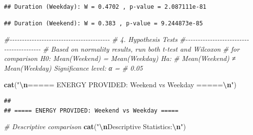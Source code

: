 \documentclass[
  12pt,
]{article}
\newenvironment{Shaded}{\begin{snugshade}}{\end{snugshade}}
\newcommand{\AttributeTok}[1]{\textcolor[rgb]{0.13,0.29,0.53}{#1}}
\newcommand{\CommentTok}[1]{\textcolor[rgb]{0.56,0.35,0.01}{\textit{#1}}}
\newcommand{\ConstantTok}[1]{\textcolor[rgb]{0.56,0.35,0.01}{#1}}
\newcommand{\DecValTok}[1]{\textcolor[rgb]{0.00,0.00,0.81}{#1}}
\newcommand{\FunctionTok}[1]{\textcolor[rgb]{0.13,0.29,0.53}{\textbf{#1}}}
\newcommand{\NormalTok}[1]{#1}
\newcommand{\SpecialCharTok}[1]{\textcolor[rgb]{0.81,0.36,0.00}{\textbf{#1}}}
\newcommand{\StringTok}[1]{\textcolor[rgb]{0.31,0.60,0.02}{#1}}
\begin{document}
\begin{verbatim}
## Duration (Weekday): W = 0.4702 , p-value = 2.087111e-81
\end{verbatim}

\begin{Shaded}
\end{Shaded}

\begin{verbatim}
## Duration (Weekend): W = 0.383 , p-value = 9.244873e-85
\end{verbatim}

\begin{Shaded}
\begin{Highlighting}[]
\CommentTok{\#{-}{-}{-}{-}{-}{-}{-}{-}{-}{-}{-}{-}{-}{-}{-}{-}{-}{-}{-}{-}{-}{-}{-}{-}{-}{-}{-}{-}{-}{-}{-}{-}{-}{-}{-}{-}{-}{-}{-}{-}{-}}
\CommentTok{\# 4. Hypothesis Tests}
\CommentTok{\#{-}{-}{-}{-}{-}{-}{-}{-}{-}{-}{-}{-}{-}{-}{-}{-}{-}{-}{-}{-}{-}{-}{-}{-}{-}{-}{-}{-}{-}{-}{-}{-}{-}{-}{-}{-}{-}{-}{-}{-}{-}}
\CommentTok{\# Based on normality results, run both t{-}test and Wilcoxon}
\CommentTok{\# for comparison H0: Mean(Weekend) = Mean(Weekday) Ha:}
\CommentTok{\# Mean(Weekend) ≠ Mean(Weekday) Significance level: α =}
\CommentTok{\# 0.05}

\FunctionTok{cat}\NormalTok{(}\StringTok{"}\SpecialCharTok{\textbackslash{}n}\StringTok{===== ENERGY PROVIDED: Weekend vs Weekday =====}\SpecialCharTok{\textbackslash{}n}\StringTok{"}\NormalTok{)}
\end{Highlighting}
\end{Shaded}

\begin{verbatim}
## 
## ===== ENERGY PROVIDED: Weekend vs Weekday =====
\end{verbatim}

\begin{Shaded}
\begin{Highlighting}[]
\CommentTok{\# Descriptive comparison}
\FunctionTok{cat}\NormalTok{(}\StringTok{"}\SpecialCharTok{\textbackslash{}n}\StringTok{Descriptive Statistics:}\SpecialCharTok{\textbackslash{}n}\StringTok{"}\NormalTok{)}
\end{Highlighting}
\end{Shaded}
\end{document}
